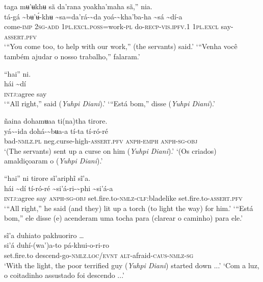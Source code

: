 \documentclass[output=paper,
modfonts,nonflat
]{langsci/langscibook}
\begin{document}
\ea taga mʉ'ʉkhʉ sã da'rana yoakha'maha sã,” nia.  \\[.3em]
\gll tá-gá	{\textasciitilde}bʉ'ʉ́-khʉ	{\textasciitilde}sa=da'rá-{\textasciitilde}da	yoá-{\textasciitilde}kha'ba-ha	{\textasciitilde}sá	{\textasciitilde}dí-a \\
     come-\textsc{imp}	2\textsc{sg-add}	1\textsc{pl.excl.poss}=work\textsc{-pl}	do\textsc{-recp-vis.ipfv.}1	1\textsc{pl.excl}	say-\textsc{assert.pfv}\\
\glt ‘“You come too, to help with our work,” (the servants) said.’
\glt ‘“Venha você também ajudar o nosso trabalho,” falaram.'
\z 

\ea “hai” ni. \\[.3em]
\gll hái	{\textasciitilde}dí \\
     \textsc{intj:}agree	say\\
\glt ‘“All right,” said (\textit{Yuhpi Diani}).'
\glt ‘“Está bom,” disse (\textit{Yuhpi Diani}).'
\z 

\ea ñaina dohamʉaa ti(na)tha tirore. \\[.3em]
\gll {\textasciitilde}yá{\textasciitilde}-ida	dohá-{\textasciitilde}bʉa-a	tí-ta	tí-ró-ré \\
     bad\textsc{-nmlz.pl}	neg.curse-high-\textsc{assert.pfv}	\textsc{anph-emph}	\textsc{anph-sg-obj}\\
\glt ‘(The servants) sent up a curse on him (\textit{Yuhpi Diani}).’
\glt ‘(Os criados) amaldiçoaram o (\textit{Yuhpi Diani}).’
\z

\newpage 
\ea “hai” ni tirore sĩ'ariphĩ sĩ'a. \\[.3em]
\gll hái	{\textasciitilde}dí	tí-ró-ré	{\textasciitilde}si'á-ri-{\textasciitilde}phi	{\textasciitilde}si'á-a \\
     \textsc{intj:}agree	say	\textsc{anph-sg-obj}	set.fire.to\textsc{-nmlz-clf:}bladelike	set.fire.to-\textsc{assert.pfv}\\
\glt ‘“All right,” he said (and they) lit up a torch (to light the way) for him.’
\glt ‘“Está bom,” ele disse (e) acenderam uma tocha para (clarear o caminho) para ele.’
\z

\ea sĩ'a duhiato pakhuoriro … \\[.3em]
\gll {\textasciitilde}si'á	duhí-(wa')a-to	pá-khui-o-ri-ro \\
     set.fire.to	descend-go-\textsc{nmlz.loc/evnt}	\textsc{alt}-afraid\textsc{-caus-nmlz-sg}\\
\glt ‘With the light, the poor terrified guy (\textit{Yuhpi Diani}) started down ...’
\glt ‘Com a luz, o coitadinho assustado foi descendo ...’
\z 
\end{document}
